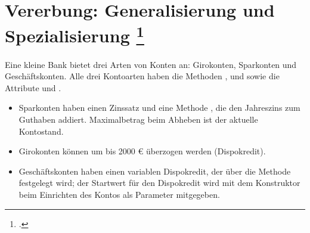 \documentclass{lehramt-informatik-aufgabe}
\begin{document}

\section{Vererbung: Generalisierung und Spezialisierung
\footcite[Seite 60, Oldenburg, Informatik II, S. 128]{oomup:fs:3}}

Eine kleine Bank bietet drei Arten von Konten an: Girokonten, Sparkonten
und Geschäftskonten. Alle drei Kontoarten haben die Methoden
,  und  sowie die
Attribute  und .

\begin{itemize}
\item Sparkonten haben einen Zinssatz und eine Methode ,
die den Jahreszins zum Guthaben addiert. Maximalbetrag beim Abheben ist
der aktuelle Kontostand.

\item Girokonten können um bis 2000 € überzogen werden (Dispokredit).

\item Geschäftskonten haben einen variablen Dispokredit, der über die
Methode  festgelegt wird; der Startwert für den
Dispokredit wird mit dem Konstruktor beim Einrichten des Kontos als
Parameter mitgegeben.
\end{itemize}
\end{document}
